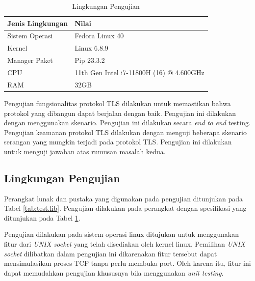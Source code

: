 \begin{table}[!h]
  \centering
  \caption{Lingkungan Pengujian} \label{tab:test.env}
  \begin{tabular}{|p{3cm}|p{6cm}|}
    \hline
    \textbf{Jenis Lingkungan} & \textbf{Nilai} \\ \hline
    Sistem Operasi & Fedora Linux 40 \\ \hline
    Kernel & Linux 6.8.9 \\ \hline
    Manager Paket & Pip 23.3.2 \\ \hline
    CPU & 11th Gen Intel i7-11800H (16) @ 4.600GHz \\ \hline
    RAM & 32GB \\ \hline
  \end{tabular}
\end{table}


Pengujian fungsionalitas protokol TLS dilakukan untuk memastikan bahwa protokol yang dibangun dapat berjalan dengan baik. Pengujian ini dilakukan dengan menggunakan skenario. Pengujian ini dilakukan secara \emph{end to end} testing. Pengujian keamanan protokol TLS dilakukan dengan menguji beberapa skenario serangan yang mungkin terjadi pada protokol TLS. Pengujian ini dilakukan untuk menguji jawaban atas rumusan masalah kedua.

\subsection{Lingkungan Pengujian}
Perangkat lunak dan pustaka yang digunakan pada pengujian ditunjukan pada Tabel \ref{tab:test.lib}. Pengujian dilakukan pada perangkat dengan spesifikasi yang ditunjukan pada Tabel \ref{tab:test.env}. 

Pengujian dilakukan pada sistem operasi linux ditujukan untuk menggunakan fitur dari \emph{UNIX socket} yang telah disediakan oleh kernel linux. Pemilihan \emph{UNIX socket} dilibatkan dalam pengujian ini dikarenakan fitur tersebut dapat mensimulasikan proses TCP tanpa perlu membuka port. Oleh karena itu, fitur ini dapat memudahkan pengujian khususnya bila menggunakan \emph{unit testing}.

